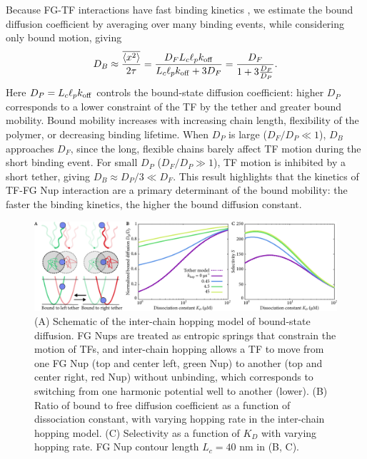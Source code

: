 Because FG-TF interactions have fast binding kinetics \cite{milles15, hough15}, we estimate the bound diffusion coefficient by averaging over many binding events, while considering only bound motion, giving \begin{equation}\label{eq:dbound}
  D_B \approx \frac{\overline{\langle x^2 \rangle}}{2\tau} = \frac{D_F L_c \ell_p
    k_{\mathrm{off}}}{L_c \ell_p k_{\mathrm{off}} + 3D_F} =
  \frac{D_F}{1+3\frac{D_F}{D_{P}}}.  
\end{equation}
Here $D_P = L_c \ell_p k_{\mathrm{off}}$ controls the bound-state diffusion coefficient: higher $D_P$ corresponds to a lower constraint of the TF by the tether and greater bound mobility. Bound mobility increases with increasing chain length, flexibility of the polymer, or decreasing binding lifetime. When $D_P$ is large ($D_F/D_P\ll1$), $D_B$ approaches $D_F$, since the long, flexible chains barely affect TF motion during the short binding event. For small $D_P$ ($D_F/D_P\gg1$), TF motion is inhibited by a short tether, giving $D_B\approx D_P/3\ll D_F$.  This result highlights that the kinetics of TF-FG Nup interaction are a primary determinant of the bound mobility: the faster the binding kinetics, the higher the bound diffusion constant.

\begin{figure}
\centering
\includegraphics[width = \textwidth]{figs/ch02/fig4.pdf}
\caption{(A) Schematic of the inter-chain hopping model of bound-state
  diffusion. FG Nups are treated as entropic springs that constrain
  the motion of TFs, and inter-chain hopping allows a TF to move from
  one FG Nup (top and center left, green Nup) to another (top and
  center right, red Nup) without unbinding, which corresponds to
  switching from one harmonic potential well to another (lower). (B)
  Ratio of bound to free diffusion coefficient as a function of
  dissociation constant, with varying hopping rate in the inter-chain
  hopping model.  (C) Selectivity as a function of $K_D$ with varying
  hopping rate. FG Nup contour length $L_c = 40$ nm in (B, C). }
\label{fig:hopping}
\end{figure}


